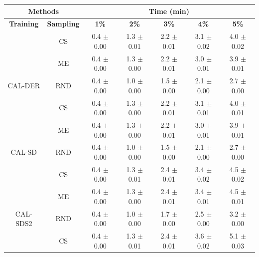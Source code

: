 \begin{table}[htbp]
\centering

\begin{tabular*}{\linewidth}{c|c|@{\extracolsep{\fill}}ccccc}
\toprule
\multicolumn{2}{c|}{\textbf{Methods}} & \multicolumn{5}{c}{\textbf{Time (min)}} \\
\midrule
\textbf{Training} & \textbf{Sampling} & \textbf{1\%} & \textbf{2\%} & \textbf{3\%} & \textbf{4\%} & \textbf{5\%}\\
\midrule
 & CS & 0.4 $\pm$ {\small 0.00} & 1.3 $\pm$ {\small 0.01} & 2.2 $\pm$ {\small 0.01} & 3.1 $\pm$ {\small 0.02} & 4.0 $\pm$ {\small 0.02}\\

 & ME & 0.4 $\pm$ {\small 0.00} & 1.3 $\pm$ {\small 0.00} & 2.2 $\pm$ {\small 0.01} & 3.0 $\pm$ {\small 0.01} & 3.9 $\pm$ {\small 0.01}\\

\multirow{-3}{*}{\raggedright\arraybackslash CAL-DER} & RND & 0.4 $\pm$ {\small 0.00} & 1.0 $\pm$ {\small 0.00} & 1.5 $\pm$ {\small 0.00} & 2.1 $\pm$ {\small 0.00} & 2.7 $\pm$ {\small 0.00}\\
\midrule
 & CS & 0.4 $\pm$ {\small 0.00} & 1.3 $\pm$ {\small 0.00} & 2.2 $\pm$ {\small 0.01} & 3.1 $\pm$ {\small 0.01} & 4.0 $\pm$ {\small 0.01}\\

 & ME & 0.4 $\pm$ {\small 0.00} & 1.3 $\pm$ {\small 0.00} & 2.2 $\pm$ {\small 0.01} & 3.0 $\pm$ {\small 0.01} & 3.9 $\pm$ {\small 0.01}\\

\multirow{-3}{*}{\raggedright\arraybackslash CAL-SD} & RND & 0.4 $\pm$ {\small 0.00} & 1.0 $\pm$ {\small 0.00} & 1.5 $\pm$ {\small 0.00} & 2.1 $\pm$ {\small 0.00} & 2.7 $\pm$ {\small 0.00}\\
\midrule
 & CS & 0.4 $\pm$ {\small 0.00} & 1.3 $\pm$ {\small 0.01} & 2.4 $\pm$ {\small 0.01} & 3.4 $\pm$ {\small 0.02} & 4.5 $\pm$ {\small 0.02}\\

 & ME & 0.4 $\pm$ {\small 0.00} & 1.3 $\pm$ {\small 0.00} & 2.4 $\pm$ {\small 0.01} & 3.4 $\pm$ {\small 0.01} & 4.5 $\pm$ {\small 0.01}\\

\multirow{-3}{*}{\raggedright\arraybackslash CAL-SDS2} & RND & 0.4 $\pm$ {\small 0.00} & 1.0 $\pm$ {\small 0.00} & 1.7 $\pm$ {\small 0.00} & 2.5 $\pm$ {\small 0.00} & 3.2 $\pm$ {\small 0.00}\\
\midrule
 & CS & 0.4 $\pm$ {\small 0.00} & 1.3 $\pm$ {\small 0.01} & 2.4 $\pm$ {\small 0.01} & 3.6 $\pm$ {\small 0.02} & 5.1 $\pm$ {\small 0.03}\\


\end{tabular*}
\end{table}
